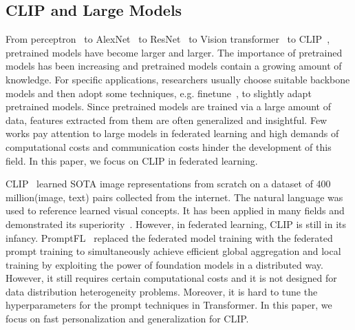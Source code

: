 \subsection{CLIP and Large Models}
From perceptron~\cite{gardner1998artificial} to AlexNet~\cite{alom2018history} to ResNet~\cite{he2016deep} to Vision transformer~\cite{yuan2021tokens} to CLIP~\cite{radford2021learning}, pretrained models have become larger and larger.
The importance of pretrained models has been increasing and pretrained models contain a growing amount of knowledge.
For specific applications, researchers usually choose suitable backbone models and then adopt some techniques, e.g. finetune~\cite{sun2019fine}, to slightly adapt pretrained models.
Since pretrained models are trained via a large amount of data, features extracted from them are often generalized and insightful.
Few works pay attention to large models in federated learning and high demands of computational costs and communication costs hinder the development of this field.
In this paper, we focus on CLIP in federated learning.

CLIP~\cite{radford2021learning} learned SOTA image representations from scratch on a dataset of 400 million(image, text) pairs collected from the internet.
The natural language was used to reference learned visual concepts.
It has been applied in many fields and demonstrated its superiority~\cite{ramesh2021zero, lee2023image}.
However, in federated learning, CLIP is still in its infancy.
PromptFL~\cite{guo2022promptfl} replaced the federated model training with the federated prompt training to simultaneously achieve efficient global aggregation and local training by exploiting the power of foundation models in a distributed way. 
However, it still requires certain computational costs and it is not designed for data distribution heterogeneity problems.
Moreover, it is hard to tune the hyperparameters for the prompt techniques in Transformer.%
In this paper, we focus on fast personalization and generalization for CLIP.

